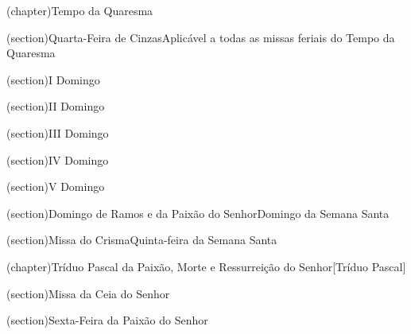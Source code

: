 
\upart(chapter){Tempo da Quaresma}\label{chapter:tempus-quadragesimae}

\uchaptercomplex*(section){Quarta-Feira de Cinzas}{Aplicável a todas as missas feriais do Tempo da Quaresma}\label{section:tempus-quadragesimae/feria-iv-cinerum}


\AllowPageFlush

\uchapter(section){I Domingo}\label{section:tempus-quadragesimae/dominica-1}


\AllowPageFlush

\uchapter(section){II Domingo}\label{section:tempus-quadragesimae/dominica-2}


\AllowPageFlush

\uchapter(section){III Domingo}\label{section:tempus-quadragesimae/dominica-3}


\uchapter(section){IV Domingo}\label{section:tempus-quadragesimae/dominica-4}


\AllowPageFlush

\uchapter(section){V Domingo}\label{section:tempus-quadragesimae/dominica-5}


\AllowPageFlush

\uchaptercomplex(section){Domingo de Ramos e da Paixão do Senhor}{Domingo da Semana Santa}\label{section:hebdomada-sancta/dominica-in-palmis-de-passione-domini}


\AllowPageFlush

\uchaptercomplex(section){Missa do Crisma}{Quinta-feira da Semana Santa}\label{section:hebdomada-sancta/missa-chrismatis}


\upart(chapter){Tríduo Pascal da Paixão, Morte e Ressurreição do Senhor}[Tríduo Pascal]\label{chapter:sacrum-triduum-paschale}

\uchapter*(section){Missa da Ceia do Senhor}\label{section:hebdomada-sancta/missa-in-cena-domini}


\uchapter(section){Sexta-Feira da Paixão do Senhor}\label{section:hebdomada-sancta/feria-6-in-passione-domini}


